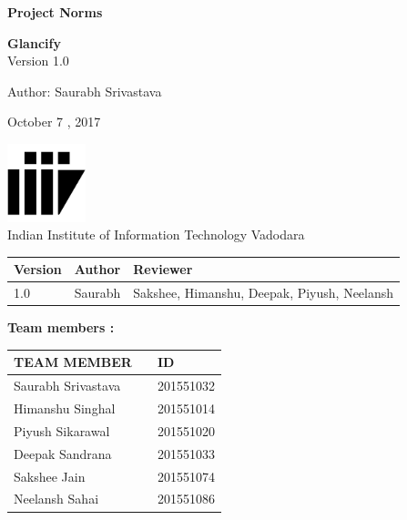 \documentclass[12pt]{article}
\renewcommand{\today}{October 7 , 2017}
\begin{document}
\begin{titlepage}
		\begin{center}
			
			
			\LARGE{\textbf{Project Norms}}
			
			\vspace{1.5cm}
			
			\textbf{Glancify}\\
			
			\small{Version 1.0}
			\vspace{3cm}
		 
            \large{Author: \hspace{0.5cm}Saurabh Srivastava}	
    	
			\vspace{1.5cm}
			
			\today
			
			\vspace{4.5cm}
			\includegraphics[width=0.17\textwidth]{iiitv.png} \\
			\Large{Indian Institute of Information Technology Vadodara} \\
			
		\end{center}
	\end{titlepage}
	\newpage
	
	\begin{tabular}{ |m{4em}| m{10em}| m{10em}|}
	    \hline
	    \textbf{Version} & \textbf{Author} & \textbf{Reviewer}\\
	    \hline
	     1.0 &Saurabh & Sakshee, Himanshu, Deepak, Piyush, Neelansh \\
	     \hline
	\end{tabular}
	
	
	\newpage
\large{\textbf{Team members :}} \\
\begin{center}
	\begin{tabular}{ |m{10em} m{5em}m{6em}|}
		\hline
		TEAM MEMBER &   & ID        \\
		\hline
		Saurabh Srivastava &   & 201551032 \\
		Himanshu Singhal &   & 201551014 \\
		Piyush Sikarawal &   & 201551020 \\
	    Deepak Sandrana &   & 201551033 \\
		Sakshee Jain &   & 201551074 \\
		Neelansh Sahai &   & 201551086 \\ 
		\hline
	\end{tabular}
	
\end{center}
\end{document}
